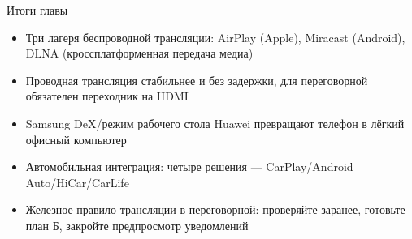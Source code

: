 \begin{tcbsummary}{Итоги главы}
\begin{itemize}
  \item Три лагеря беспроводной трансляции: AirPlay (Apple), Miracast (Android), DLNA (кроссплатформенная передача медиа)
  \item Проводная трансляция стабильнее и без задержки, для переговорной обязателен переходник на HDMI
  \item Samsung DeX/режим рабочего стола Huawei превращают телефон в лёгкий офисный компьютер
  \item Автомобильная интеграция: четыре решения — CarPlay/Android Auto/HiCar/CarLife
  \item Железное правило трансляции в переговорной: проверяйте заранее, готовьте план Б, закройте предпросмотр уведомлений
\end{itemize}

\end{tcbsummary}
